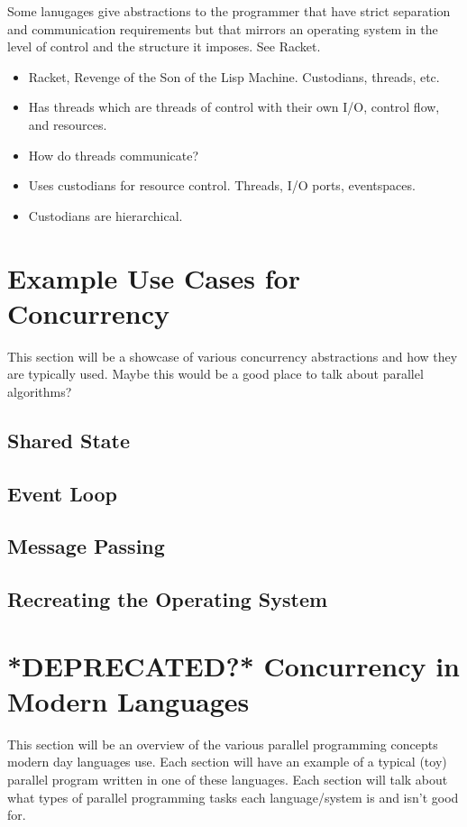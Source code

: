 \documentclass{article}
\begin{document}
Some lanugages give abstractions to the programmer that have strict
separation and communication requirements but that mirrors an operating
system in the level of control and the structure it imposes. See Racket.

\begin{itemize}
  \item Racket, Revenge of the Son of the Lisp Machine. Custodians, threads,
        etc.
  \item Has threads which are threads of control with their own I/O, control
        flow, and resources.
  \item How do threads communicate?
  \item Uses custodians for resource control. Threads, I/O ports, eventspaces.
  \item Custodians are hierarchical.
\end{itemize}

\section{Example Use Cases for Concurrency}

This section will be a showcase of various concurrency abstractions
and how they are typically used. Maybe this would be a good place to
talk about parallel algorithms?

\subsection{Shared State}

\subsection{Event Loop}

\subsection{Message Passing}

\subsection{Recreating the Operating System}

\section{*DEPRECATED?* Concurrency in Modern Languages}
This section will be an overview of the various parallel programming
concepts modern day languages use. Each section will have an example of
a typical (toy) parallel program written in one of these languages. Each
section will talk about what types of parallel programming tasks
each language/system is and isn't good for.
\end{document}
